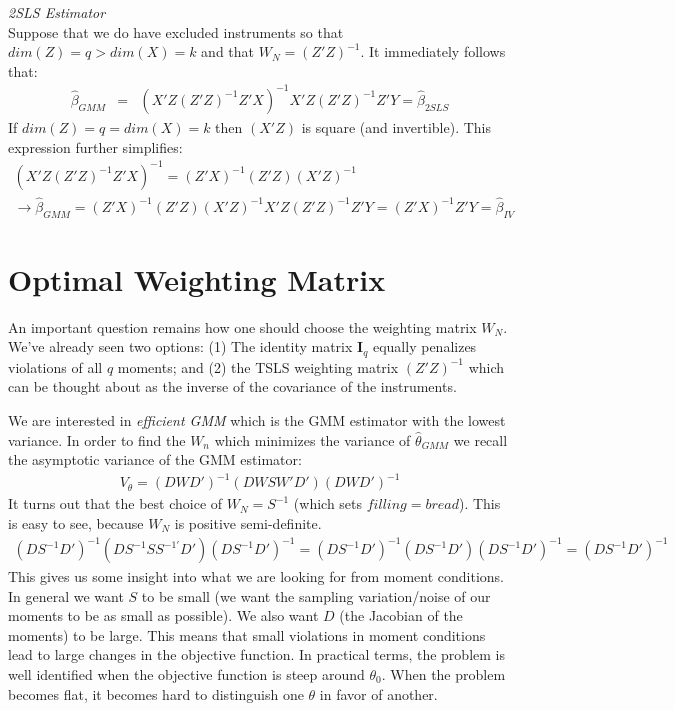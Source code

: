\documentclass[a4paper]{article}
\begin{document}
\noindent \textit{2SLS Estimator}\\
Suppose that we do have excluded instruments so that $dim(Z) = q > dim(X) = k$ and that $W_N = (Z'Z)^{-1}$. It immediately follows that:
\begin{eqnarray*}
\hat{\beta}_{GMM} &=& (X'Z (Z'Z)^{-1} Z' X)^{-1} X' Z (Z'Z)^{-1} Z'Y = \hat{\beta}_{2SLS}
\end{eqnarray*}
If $dim(Z) = q = dim(X) = k$ then $(X'Z)$ is square (and invertible). This expression further simplifies:
\begin{eqnarray*}
(X'Z (Z'Z)^{-1} Z' X)^{-1} = (Z'X)^{-1} (Z'Z) (X'Z)^{-1}\\
\rightarrow \hat{\beta}_{GMM} = (Z'X)^{-1} (Z'Z) (X'Z)^{-1}  X' Z (Z'Z)^{-1} Z'Y = (Z'X)^{-1} Z'Y = \hat{\beta}_{IV}
\end{eqnarray*}


\section*{\normalsize  Optimal Weighting Matrix}
An important question remains how one should choose the weighting matrix $W_N$. We've already seen two options: (1) The identity matrix $\mathbf{I}_q$ equally penalizes violations of all $q$ moments; and (2) the TSLS weighting matrix $(Z'Z)^{-1}$ which can be thought about as the inverse of the covariance of the instruments. 


We are interested in \textit{efficient GMM} which is the GMM estimator with the lowest variance. In order to find the $W_n$ which minimizes the variance of $\hat{\theta}_{GMM}$ we recall the asymptotic variance of the GMM estimator:
\begin{eqnarray*}
V_{\theta} =(D W D')^{-1} (D W S W' D') (D W D')^{-1}
\end{eqnarray*}
It turns out that the best choice of $W_N = S^{-1}$ (which sets $filling = bread$). This is easy to see, because $W_N$ is positive semi-definite.
\begin{eqnarray*}
(D S^{-1} D')^{-1} (D S^{-1} S S^{-1'} D') (D S^{-1} D')^{-1} = (D S^{-1} D')^{-1} (D S^{-1} D') (D S^{-1} D')^{-1} = (D S^{-1} D')^{-1}
\end{eqnarray*}
This gives us some insight into what we are looking for from moment conditions. In general we want $S$ to be small (we want the sampling variation/noise of our moments to be as small as possible). We also want $D$ (the Jacobian of the moments) to be large. This means that small violations in moment conditions lead to large changes in the objective function. In practical terms, the problem is well identified when the objective function is steep around $\theta_0$. When the problem becomes flat, it becomes hard to distinguish one $\theta$ in favor of another.
\end{document}
